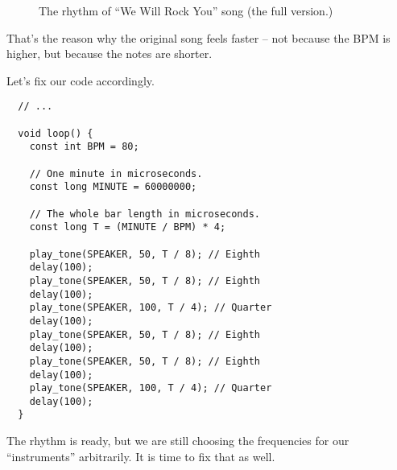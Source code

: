 \documentclass[../sparc.tex]{subfiles}
\begin{document}
\begin{figure}[ht]
  \centering
  \caption{The rhythm of ``We Will Rock You'' song (the full version.)}
  \label{fig:lilypond-queen-2}
\end{figure}

That's the reason why the original song feels faster -- not because the BPM is
higher, but because the notes are shorter.

Let's fix our code accordingly.

\begin{verbatim}
  // ...

  void loop() {
    const int BPM = 80;

    // One minute in microseconds.
    const long MINUTE = 60000000;

    // The whole bar length in microseconds.
    const long T = (MINUTE / BPM) * 4;

    play_tone(SPEAKER, 50, T / 8); // Eighth
    delay(100);
    play_tone(SPEAKER, 50, T / 8); // Eighth
    delay(100);
    play_tone(SPEAKER, 100, T / 4); // Quarter
    delay(100);
    play_tone(SPEAKER, 50, T / 8); // Eighth
    delay(100);
    play_tone(SPEAKER, 50, T / 8); // Eighth
    delay(100);
    play_tone(SPEAKER, 100, T / 4); // Quarter
    delay(100);
  }
\end{verbatim}

The rhythm is ready, but we are still choosing the frequencies for our
``instruments'' arbitrarily.  It is time to fix that as well.
\end{document}
